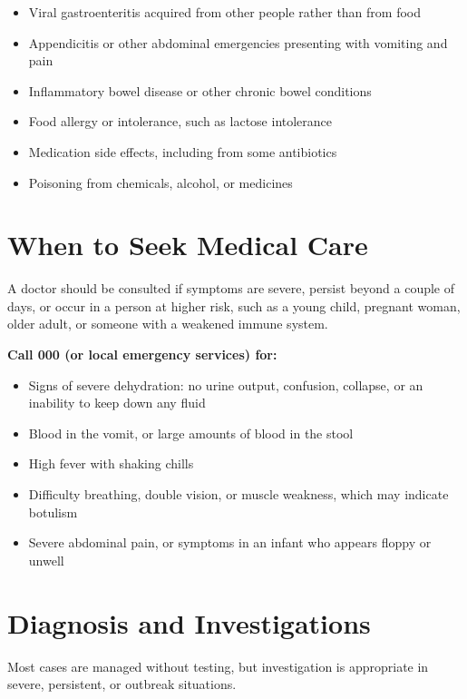 \begin{itemize}
    \item Viral gastroenteritis acquired from other people rather than from food
    \item Appendicitis or other abdominal emergencies presenting with vomiting and pain
    \item Inflammatory bowel disease or other chronic bowel conditions
    \item Food allergy or intolerance, such as lactose intolerance
    \item Medication side effects, including from some antibiotics
    \item Poisoning from chemicals, alcohol, or medicines
\end{itemize}

\section*{When to Seek Medical Care}
A doctor should be consulted if symptoms are severe, persist beyond a couple of days, or occur in a person at higher risk, such as a young child, pregnant woman, older adult, or someone with a weakened immune system.

\textbf{Call 000 (or local emergency services) for:}
\begin{itemize}
    \item Signs of severe dehydration: no urine output, confusion, collapse, or an inability to keep down any fluid
    \item Blood in the vomit, or large amounts of blood in the stool
    \item High fever with shaking chills
    \item Difficulty breathing, double vision, or muscle weakness, which may indicate botulism
    \item Severe abdominal pain, or symptoms in an infant who appears floppy or unwell
\end{itemize}

\section*{Diagnosis and Investigations}
Most cases are managed without testing, but investigation is appropriate in severe, persistent, or outbreak situations.

